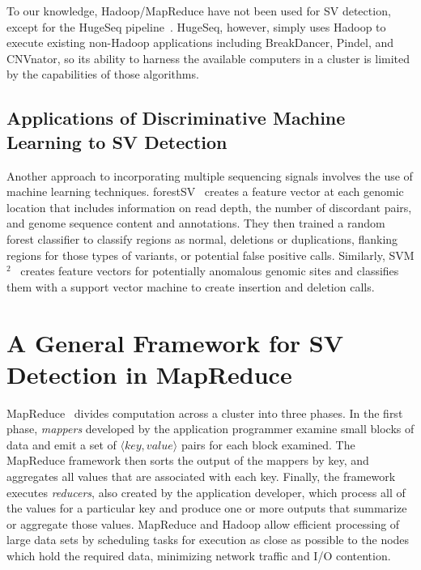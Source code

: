 \documentclass [11pt] {report}
\begin{document}
To our knowledge, Hadoop/MapReduce have not been used for SV detection, except for the HugeSeq pipeline~\cite{Lam:2012jy}. HugeSeq, however, simply uses Hadoop to execute existing non-Hadoop applications including BreakDancer, Pindel, and CNVnator, so its ability to harness the available computers in a cluster is limited by the capabilities of those algorithms.

\section{Applications of Discriminative Machine Learning to SV Detection}

Another approach to incorporating multiple sequencing signals involves the use of machine learning techniques. forestSV~\cite{Michaelson:2012fj} creates a feature vector at each genomic location that includes information on read depth, the number of discordant pairs, and genome sequence content and annotations. They then trained a random forest classifier to classify regions as normal, deletions or duplications, flanking regions for those types of variants, or potential false positive calls. Similarly, SVM$^2$~\cite{Chiara:2012ey} creates feature vectors for potentially anomalous genomic sites and classifies them with a support vector machine to create insertion and deletion calls.

% 

\chapter{A General Framework for SV Detection in MapReduce}

MapReduce~\cite{Dean:2008p277} divides computation across a cluster into three phases. In the first phase, \emph{mappers} developed by the application programmer examine small blocks of data and emit a set of $\langle key, value \rangle$ pairs for each block examined. The MapReduce framework then sorts the output of the mappers by key, and aggregates all values that are associated with each key. Finally, the framework executes \emph{reducers}, also created by the application developer, which process all of the values for a particular key and produce one or more outputs that summarize or aggregate those values. MapReduce and Hadoop allow efficient processing of large data sets by scheduling tasks for execution as close as possible to the nodes which hold the required data, minimizing network traffic and I/O contention.
\end{document}
